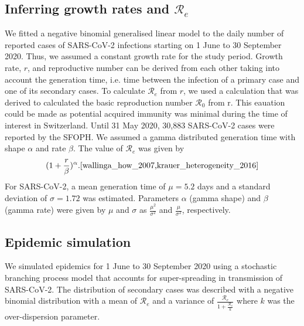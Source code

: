 \documentclass[10pt, a4paper, twoside]{article}
\begin{document}
\begin{multicols}{2}
\subsection{Inferring growth rates and $\mathcal{R}_e$}\label{marker}
We fitted a negative binomial generalised linear model to the daily number of reported cases of SARS-CoV-2 infections starting on 1 June to 30 September 2020. 
Thus, we assumed a constant growth rate for the study period.
Growth rate, $r$, and reproductive number can be derived from each other taking into account the generation time, i.e. time between the infection of a primary case and one of its secondary cases.\cite{svensson_note_2007}
To calculate $\mathcal{R}_e$ from $r$, we used a calculation that was derived to calculated the basic reproduction number $\mathcal{R}_0$ from r.
This eauation could be made as potential acquired immunity was minimal during the time of interest in Switzerland.
Until 31 May 2020, 30,883 SARS-CoV-2 cases were reported by the SFOPH.\cite{federal_office_of_public_health_coronavirus_nodate}
We assumed a gamma distributed generation time with shape $\alpha$ and rate $\beta$.
The value of  $\mathcal{R}_e$ was given by \[ (1 + \frac{r}{\beta} )^\alpha.\cite{wallinga_how_2007,krauer_heterogeneity_2016} \]
For SARS-CoV-2, a mean generation time  of $\mu= 5.2$ days and a standard deviation of $\sigma = 1.72$ was estimated.\cite{ganyani_estimating_2020}
Parameters $\alpha$ (gamma shape) and $\beta$  (gamma rate) were given by $\mu$ and $\sigma$ as $\frac{\mu^2}{\sigma^2 }$ and $\frac{\mu}{\sigma^2}$, respectively.

\subsection{Epidemic simulation}
We simulated epidemics for 1 June to 30 September 2020 using a stochastic branching process model that accounts for super-spreading in transmission of SARS-CoV-2.
The distribution of secondary cases was described with a negative binomial distribution with a mean of $\mathcal{R}_e$ and a variance of $\frac{\mathcal{R}_e}{1+\frac{\mathcal{R}_e}{k}}$ where $k$ was the over-dispersion parameter.


\end{multicols}
\end{document}
